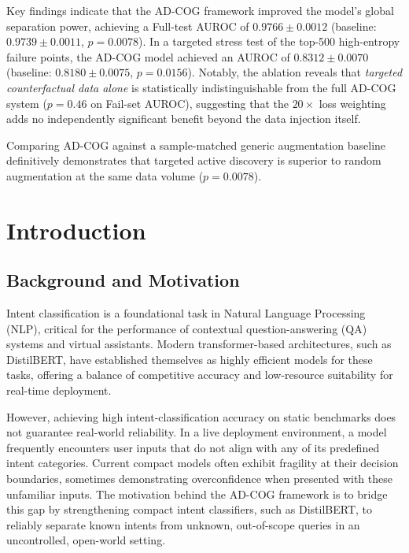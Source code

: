 \documentclass[11pt,a4paper]{article}
\begin{document}
Key findings indicate that the AD-COG framework improved the model's global separation power, achieving a Full-test AUROC of $0.9766 \pm 0.0012$ (baseline: $0.9739 \pm 0.0011$, $p = 0.0078$). In a targeted stress test of the top-500 high-entropy failure points, the AD-COG model achieved an AUROC of $0.8312 \pm 0.0070$ (baseline: $0.8180 \pm 0.0075$, $p = 0.0156$). Notably, the ablation reveals that \emph{targeted counterfactual data alone} is statistically indistinguishable from the full AD-COG system ($p = 0.46$ on Fail-set AUROC), suggesting that the $20\times$ loss weighting adds no independently significant benefit beyond the data injection itself.

Comparing AD-COG against a sample-matched generic augmentation baseline definitively demonstrates that targeted active discovery is superior to random augmentation at the same data volume ($p = 0.0078$).

\section{Introduction}

\subsection{Background and Motivation}
Intent classification is a foundational task in Natural Language Processing (NLP), critical for the performance of contextual question-answering (QA) systems and virtual assistants. Modern transformer-based architectures, such as DistilBERT, have established themselves as highly efficient models for these tasks, offering a balance of competitive accuracy and low-resource suitability for real-time deployment.

However, achieving high intent-classification accuracy on static benchmarks does not guarantee real-world reliability. In a live deployment environment, a model frequently encounters user inputs that do not align with any of its predefined intent categories. Current compact models often exhibit fragility at their decision boundaries, sometimes demonstrating overconfidence when presented with these unfamiliar inputs. The motivation behind the AD-COG framework is to bridge this gap by strengthening compact intent classifiers, such as DistilBERT, to reliably separate known intents from unknown, out-of-scope queries in an uncontrolled, open-world setting.
\end{document}
